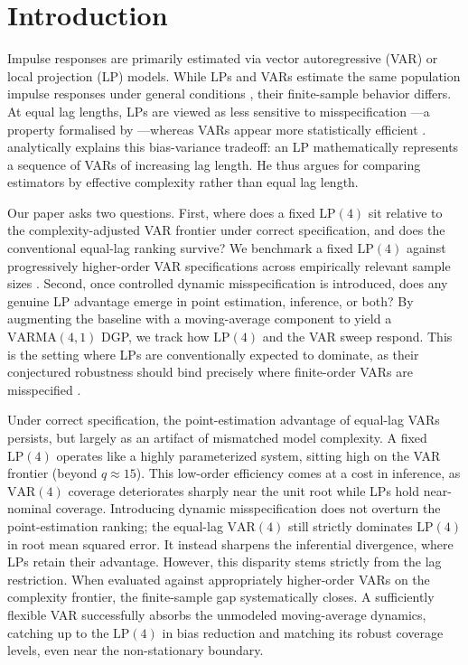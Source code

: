 
\section{Introduction}
Impulse responses are primarily estimated via vector autoregressive (VAR) or local projection (LP) models. While LPs and VARs estimate the same population impulse responses under general conditions \parencite{plagborg2021local, fusari2026more}, their finite-sample behavior differs. At equal lag lengths, LPs are viewed as less sensitive to misspecification \parencite{jorda2005estimation, ramey2016macroeconomic}---a property formalised by \textcite{olea2024double}---whereas VARs appear more statistically efficient \parencite{li2024local, olea2025local}. \textcite{ludwig2026local} analytically explains this bias-variance tradeoff: an LP mathematically represents a sequence of VARs of increasing lag length. He thus argues for comparing estimators by effective complexity rather than equal lag length.

Our paper asks two questions. First, where does a fixed $\text{LP}(4)$ sit relative to the complexity-adjusted VAR frontier under correct specification, and does the conventional equal-lag ranking survive? We benchmark a fixed $\text{LP}(4)$ against progressively higher-order VAR specifications \parencite{de2025long} across empirically relevant sample sizes \parencite[see e.g.][]{herbst2024bias}. Second, once controlled dynamic misspecification is introduced, does any genuine LP advantage emerge in point estimation, inference, or both? By augmenting the baseline with a moving-average component to yield a $\text{VARMA}(4,1)$ DGP, we track how $\text{LP}(4)$ and the VAR sweep respond. This is the setting where LPs are conventionally expected to dominate, as their conjectured robustness should bind precisely where finite-order VARs are misspecified \parencite{jorda2005estimation, li2024local,olea2024double}.

Under correct specification, the point-estimation advantage of equal-lag VARs persists, but largely as an artifact of mismatched model complexity. A fixed $\text{LP}(4)$ operates like a highly parameterized system, sitting high on the VAR frontier (beyond $q \approx 15$). This low-order efficiency comes at a cost in inference, as $\text{VAR}(4)$ coverage deteriorates sharply near the unit root while LPs hold near-nominal coverage. Introducing dynamic misspecification does not overturn the point-estimation ranking; the equal-lag $\text{VAR}(4)$ still strictly dominates $\text{LP}(4)$ in root mean squared error. It instead sharpens the inferential divergence, where LPs retain their advantage. However, this disparity stems strictly from the lag restriction. When evaluated against appropriately higher-order VARs on the complexity frontier, the finite-sample gap systematically closes. A sufficiently flexible VAR successfully absorbs the unmodeled moving-average dynamics, catching up to the $\text{LP}(4)$ in bias reduction and matching its robust coverage levels, even near the non-stationary boundary.

